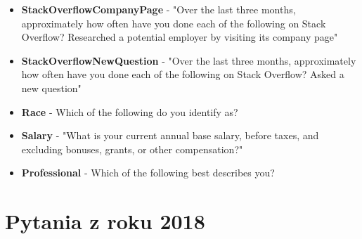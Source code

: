 \begin{appendices}
\begin{itemize}
        \item \textbf{StackOverflowCompanyPage} - "Over the last three months, approximately how often have you done each of the following on Stack Overflow? Researched a potential employer by visiting its company page"
        \item \textbf{StackOverflowNewQuestion} - "Over the last three months, approximately how often have you done each of the following on Stack Overflow? Asked a new question"
        \item \textbf{Race} - Which of the following do you identify as?
        \item \textbf{Salary} - "What is your current annual base salary, before taxes, and excluding bonuses, grants, or other compensation?"
        \item \textbf{Professional} - Which of the following best describes you?
    \end{itemize}


    \section{Pytania z roku 2018}\label{pytania-2018}


\end{appendices}
